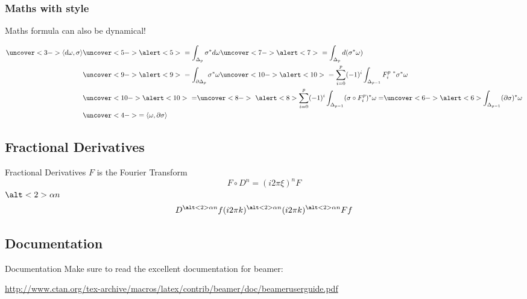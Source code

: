 \documentclass[
compress]
{beamer}
\begin{document}
\begin{frame}
\frametitle{Maths with style}
Maths formula can also be dynamical!

\begin{align*}
\uncover<3->{\langle d\omega, \sigma \rangle} &
\uncover<5->{\alert<5>{\ = \int_{\Delta_p} \sigma^\ast d\omega}}
\uncover<7->{\alert<7>{\ = \int_{\Delta_p} d( \sigma^\ast \omega)}} \\
 & \uncover<9->{\alert<9>{\ = \int_{\partial \Delta_p} \sigma^\ast \omega}}
 \uncover<10->{\alert<10>{\ = \sum_{i=0}^p (-1)^i \int_{\Delta_{p-1}} F^{p\ \ast}_i \sigma^\ast \omega}}\\ 
 & \uncover<10->{\alert<10>{\ =}} \uncover<8->{\ \alert<8>{\sum_{i=0}^p (-1)^i \int_{\Delta_{p-1}} (\sigma \circ F^p_i)^\ast \omega = }}
 \uncover<6->{\alert<6>{\int_{\Delta_{p-1}} (\partial \sigma )^\ast \omega}} \\
 & \uncover<4->{= \langle \omega, \partial \sigma \rangle}
\end{align*}
\end{frame}

\subsection{Fractional Derivatives}

\begin{frame}{Fractional Derivatives}
$F$ is the Fourier Transform
$$F\circ D^n = (i2\pi\xi)^n F$$
$\alt<2>{\alpha }{n}$
\begin{equation*}
D^{\alt<2>{\alpha}{n}} f
{(i2\pi k)^{\alt<2>{\alpha}{n}}}
 (i2\pi k)^{\alt<2>{\alpha}{n}} F f
\end{equation*}
\end{frame}


\subsection{Documentation}
\begin{frame}{Documentation}
Make sure to read the excellent documentation for beamer:

\url{http://www.ctan.org/tex-archive/macros/latex/contrib/beamer/doc/beameruserguide.pdf}
\end{frame}
\end{document}
